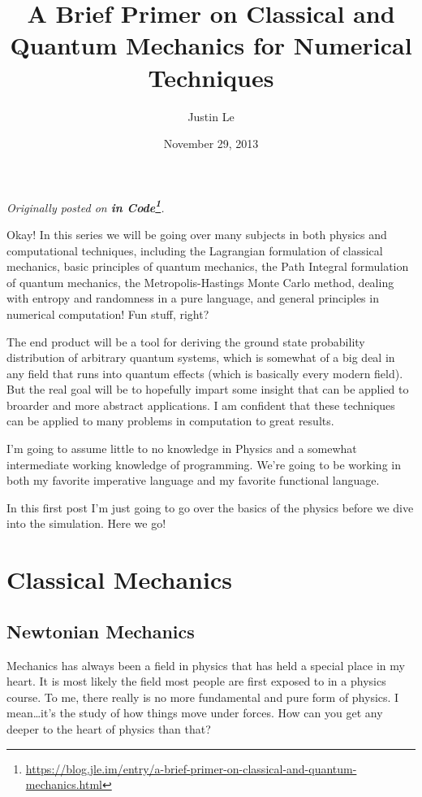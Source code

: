 \documentclass[]{article}
\title{A Brief Primer on Classical and Quantum Mechanics for Numerical Techniques}
\author{Justin Le}
\date{November 29, 2013}
\renewcommand{\href}[2]{#2\footnote{\url{#1}}}
\begin{document}
\maketitle

\emph{Originally posted on
\textbf{\href{https://blog.jle.im/entry/a-brief-primer-on-classical-and-quantum-mechanics.html}{in
Code}}.}

Okay! In this series we will be going over many subjects in both physics and
computational techniques, including the Lagrangian formulation of classical
mechanics, basic principles of quantum mechanics, the Path Integral formulation
of quantum mechanics, the Metropolis-Hastings Monte Carlo method, dealing with
entropy and randomness in a pure language, and general principles in numerical
computation! Fun stuff, right?

The end product will be a tool for deriving the ground state probability
distribution of arbitrary quantum systems, which is somewhat of a big deal in
any field that runs into quantum effects (which is basically every modern
field). But the real goal will be to hopefully impart some insight that can be
applied to broarder and more abstract applications. I am confident that these
techniques can be applied to many problems in computation to great results.

I'm going to assume little to no knowledge in Physics and a somewhat
intermediate working knowledge of programming. We're going to be working in both
my favorite imperative language and my favorite functional language.

In this first post I'm just going to go over the basics of the physics before we
dive into the simulation. Here we go!

\hypertarget{classical-mechanics}{%
\section{Classical Mechanics}\label{classical-mechanics}}

\hypertarget{newtonian-mechanics}{%
\subsection{Newtonian Mechanics}\label{newtonian-mechanics}}

Mechanics has always been a field in physics that has held a special place in my
heart. It is most likely the field most people are first exposed to in a physics
course. To me, there really is no more fundamental and pure form of physics. I
mean\ldots it's the study of how things move under forces. How can you get any
deeper to the heart of physics than that?
\end{document}
